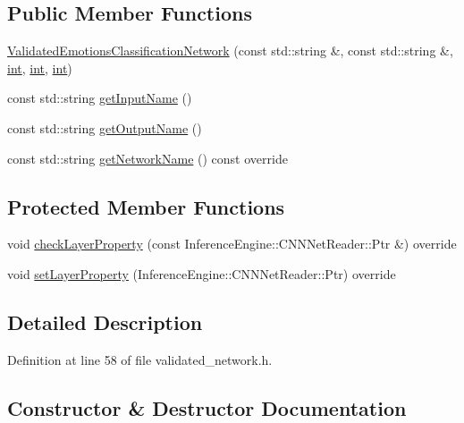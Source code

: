 \subsection*{Public Member Functions}
\begin{DoxyCompactItemize}
\item 
\hyperlink{classValidatedEmotionsClassificationNetwork_a4cc89d1e6870163f7331b55d215dc5ef}{Validated\+Emotions\+Classification\+Network} (const std\+::string \&, const std\+::string \&, \hyperlink{CMakeCache_8txt_a79a3d8790b2588b09777910863574e09}{int}, \hyperlink{CMakeCache_8txt_a79a3d8790b2588b09777910863574e09}{int}, \hyperlink{CMakeCache_8txt_a79a3d8790b2588b09777910863574e09}{int})
\item 
const std\+::string \hyperlink{classValidatedEmotionsClassificationNetwork_a68abd014c0fc517166eac4e30cf71d3d}{get\+Input\+Name} ()
\item 
const std\+::string \hyperlink{classValidatedEmotionsClassificationNetwork_a271d2283eb7fa011ebb3c846b6d706d0}{get\+Output\+Name} ()
\item 
const std\+::string \hyperlink{classValidatedEmotionsClassificationNetwork_a37181363cf9367379cdcb11cb2d5e7b7}{get\+Network\+Name} () const override
\end{DoxyCompactItemize}
\subsection*{Protected Member Functions}
\begin{DoxyCompactItemize}
\item 
void \hyperlink{classValidatedEmotionsClassificationNetwork_a825e707c901677e44ac46a9df6458a56}{check\+Layer\+Property} (const Inference\+Engine\+::\+C\+N\+N\+Net\+Reader\+::\+Ptr \&) override
\item 
void \hyperlink{classValidatedEmotionsClassificationNetwork_a1ee0df076b78a08a00bf9447e9130d09}{set\+Layer\+Property} (Inference\+Engine\+::\+C\+N\+N\+Net\+Reader\+::\+Ptr) override
\end{DoxyCompactItemize}


\subsection{Detailed Description}


Definition at line 58 of file validated\+\_\+network.\+h.



\subsection{Constructor \& Destructor Documentation}
